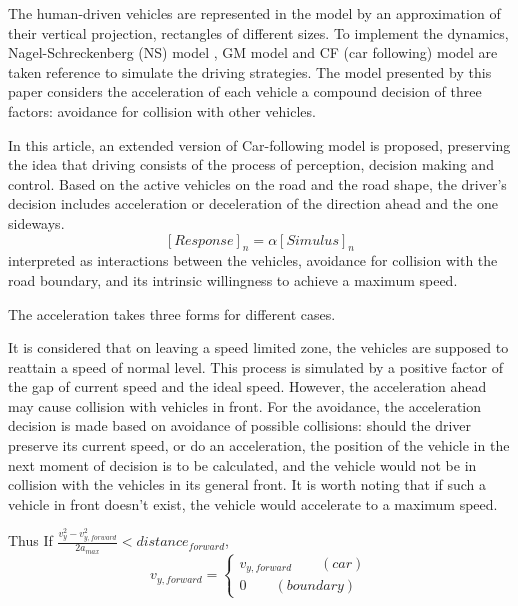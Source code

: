 \documentclass{mcmthesis}
\begin{document}
The human-driven vehicles are represented in the model by an approximation of their vertical projection, rectangles of different sizes. To implement the dynamics, Nagel-Schreckenberg (NS) model \cite{acelluar}, GM model and CF (car following) model are taken reference to simulate the driving strategies. The model presented by this paper considers the acceleration of each vehicle a compound decision of three factors: avoidance for collision with other vehicles.


In this article, an extended version of Car-following model is proposed, preserving the idea that driving consists of the process of perception, decision making and control. Based on the active vehicles on the road and the road shape, the driver's decision includes acceleration or deceleration of the direction ahead and the one sideways.
$$[Response]_n= \alpha [Simulus]_n$$
 interpreted as interactions between the vehicles, avoidance for collision with the road boundary, and its intrinsic willingness to achieve a maximum speed. 

The acceleration takes three forms for different cases.

It is considered that on leaving a speed limited zone, the vehicles are supposed to reattain a speed of normal level. This process is simulated by a positive factor of the gap of current speed and the ideal speed. However, the acceleration ahead may cause collision with vehicles in front. For the avoidance, the acceleration decision is made based on avoidance of possible collisions: should the driver preserve its current speed, or do an acceleration, the position of the vehicle in the next moment of decision is to be calculated, and the vehicle would not be in collision with the vehicles in its general front. It is worth noting that if such a vehicle in front doesn't exist, the vehicle would accelerate to a maximum speed.

Thus %
If $\frac{v_y^2-v_{y,forward}^2}{2a_{max}}<distance_{forward}$,
$$v_{y,forward}= \left\{ 
\begin{aligned}
v_{y,forward} \qquad (car)\\
0 \qquad (boundary)
\end{aligned}
\right.
$$
\end{document}
